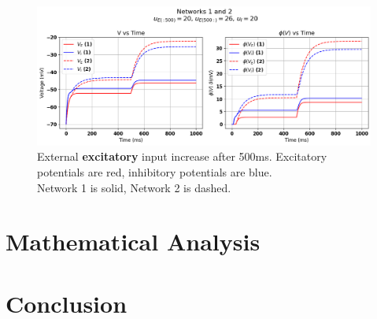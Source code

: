 \documentclass[10pt,twocolumn]{article}
\begin{document}
\begin{figure}
    \centering
    \captionsetup{justification=centering}
    \includegraphics[width=1\textwidth]{images/12-E_input.png}
    \caption{External \textbf{excitatory} input increase after 500ms. Excitatory potentials are red, inhibitory potentials are blue.\\Network 1 is solid, Network 2 is dashed.}
    \label{fig:e-input}
\end{figure}

\section{Mathematical Analysis}

\section{Conclusion}

\pagebreak
\printbibliography
\end{document}
